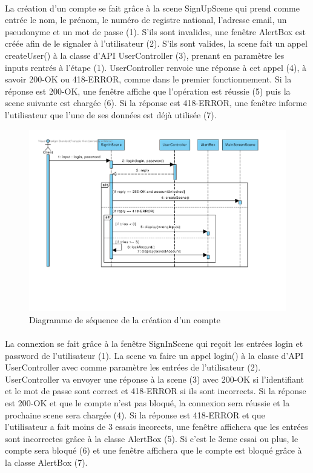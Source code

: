 \documentclass[]{article}
\begin{document}
    \paragraph{} La création d’un compte se fait grâce à la scene SignUpScene qui prend comme entrée le nom, le prénom, le numéro de registre national, l’adresse email, un pseudonyme et un mot de passe (1). S’ils sont invalides, une fenêtre AlertBox est créée afin de le signaler à l’utilisateur (2). S’ils sont valides, la scene fait un appel createUser() à la classe d’API UserController (3), prenant en paramètre les inputs rentrés à l’étape (1). UserController renvoie une réponse à cet appel (4), à savoir 200-OK ou 418-ERROR, comme dans le premier fonctionnement. Si la réponse est 200-OK, une fenêtre affiche que l’opération est réussie (5) puis la scene suivante est chargée (6). Si la réponse est 418-ERROR, une fenêtre informe l’utilisateur que l’une de ses données est déjà utilisée (7).

    \newpage

    \begin{figure}[ht]
        \centering
        \includegraphics[scale=0.45]{img/Connexion.pdf}
        \caption{Diagramme de séquence de la création d'un compte}
        \label{fig4}
        \end{figure}

    \paragraph{} La connexion se fait grâce à la fenêtre SignInScene qui reçoit les entrées login et password de l’utilisateur (1). La scene va faire un appel login() à la classe d’API UserController avec comme paramètre les entrées de l’utilisateur (2). UserController va envoyer une réponse à la scene (3) avec 200-OK si l’identifiant et le mot de passe sont correct et 418-ERROR si ils sont incorrects. Si la réponse est 200-OK et que le compte n’est pas bloqué, la connexion sera réussie et la prochaine scene sera chargée (4). Si la réponse est 418-ERROR et que l’utilisateur a fait moins de 3 essais incorects, une fenêtre affichera que les entrées sont incorrectes grâce à la classe AlertBox (5). Si c’est le 3eme essai ou plus, le compte sera bloqué (6) et une fenêtre affichera que le compte est bloqué grâce à la classe AlertBox (7).
\end{document}
